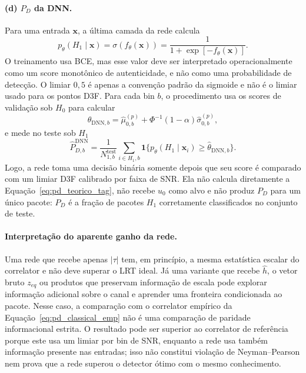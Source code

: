 \documentclass[12pt,a4paper]{article}
\begin{document}
\paragraph{(d) $P_D$ da DNN.}
Para uma entrada $\mathbf{x}$, a última camada da rede calcula
\begin{equation}
    p_{\theta}(H_1\mid\mathbf{x})=\sigma(f_{\theta}(\mathbf{x}))
    =\frac{1}{1+\exp[-f_{\theta}(\mathbf{x})]}.
    \label{eq:dnn_score}
\end{equation}
O treinamento usa BCE, mas esse valor deve ser interpretado operacionalmente como um score monotônico de autenticidade, e não como uma probabilidade de detecção. O limiar $0{,}5$ é apenas a convenção padrão da sigmoide e não é o limiar usado para os pontos D3F. Para cada bin $b$, o procedimento usa os scores de validação sob $H_0$ para calcular
\begin{equation}
    \widehat{\theta}_{\mathrm{DNN},b}=\widehat{\mu}_{0,b}^{(p)}
    +\Phi^{-1}(1-\alpha)\widehat{\sigma}_{0,b}^{(p)},
    \label{eq:threshold_dnn_d3f}
\end{equation}
e mede no teste sob $H_1$
\begin{equation}
    \widehat{P}_{D,b}^{\mathrm{DNN}}=\frac{1}{N_{1,b}^{\mathrm{test}}}
    \sum_{i\in H_1,b}\mathbf{1}\{p_{\theta}(H_1\mid\mathbf{x}_i)
    \geq\widehat{\theta}_{\mathrm{DNN},b}\}.
    \label{eq:pd_dnn_d3f}
\end{equation}
Logo, a rede toma uma decisão binária somente depois que seu score é comparado com um limiar D3F calibrado por faixa de SNR. Ela não calcula diretamente a Equação~\eqref{eq:pd_teorico_tag}, não recebe $u_0$ como alvo e não produz $P_D$ para um único pacote: $P_D$ é a fração de pacotes $H_1$ corretamente classificados no conjunto de teste.

\paragraph{Interpretação do aparente ganho da rede.}
Uma rede que recebe apenas $|\tau|$ tem, em princípio, a mesma estatística escalar do correlator e não deve superar o LRT ideal. Já uma variante que recebe $\hat h$, o vetor bruto $z_{eq}$ ou produtos que preservam informação de escala pode explorar informação adicional sobre o canal e aprender uma fronteira condicionada ao pacote. Nesse caso, a comparação com o correlator empírico da Equação~\eqref{eq:pd_classical_emp} não é uma comparação de paridade informacional estrita. O resultado pode ser superior ao correlator de referência porque este usa um limiar por bin de SNR, enquanto a rede usa também informação presente nas entradas; isso não constitui violação de Neyman--Pearson nem prova que a rede superou o detector ótimo com o mesmo conhecimento.
\end{document}
